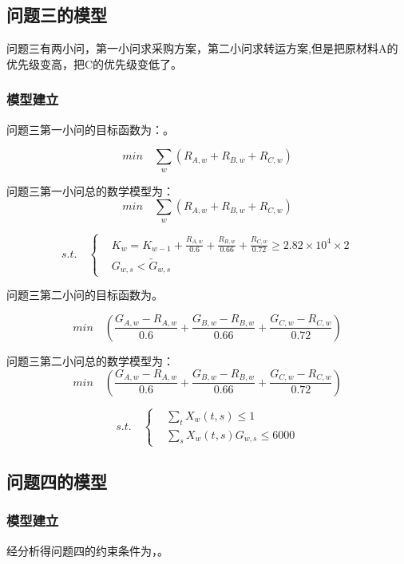 \documentclass[withoutpreface,bwprint]{cumcmthesis} %
\begin{document}
\subsection{问题三的模型}
问题三有两小问，第一小问求采购方案，第二小问求转运方案,但是把原材料A的优先级变高，把C的优先级变低了。
\subsubsection{模型建立}

问题三第一小问的目标函数为：。

\begin{equation}
min \quad \sum\limits_w(R_{A,w}+R_{B,w}+R_{C,w})
\label{eq:yue4}
\end{equation}

问题三第一小问总的数学模型为：
\[
min \quad \sum\limits_w(R_{A,w}+R_{B,w}+R_{C,w})
\]

$$ s.t. \quad \left\{
\begin{aligned}
    & K_w=K_{w-1}+\frac{R_{A,w}}{0.6}+\frac{R_{B,w}}{0.66}+\frac{R_{C,w}}{0.72}\ge 2.82\times 10^4\times 2 \\
    & G_{w,s}<\widetilde{G}_{w,s}
\end{aligned}
\right.
$$

问题三第二小问的目标函数为\cite{eq:yue5}。

\begin{equation}
min \quad (\frac{G_{A,w}-R_{A,w}}{0.6}+\frac{G_{B,w}-R_{B,w}}{0.66}+\frac{G_{C,w}-R_{C,w}}{0.72})
\label{eq:yue5}
\end{equation}

问题三第二小问总的数学模型为：
\[
min \quad (\frac{G_{A,w}-R_{A,w}}{0.6}+\frac{G_{B,w}-R_{B,w}}{0.66}+\frac{G_{C,w}-R_{C,w}}{0.72})
\]

$$ s.t. \quad \left\{
\begin{aligned}
    & \sum\limits_t X_w(t,s)\le 1 \\
    & \sum\limits_s X_w(t,s)G_{w,s}\le 6000
\end{aligned}
\right.
$$


\subsection{问题四的模型}
\subsubsection{模型建立}
经分析得问题四的约束条件为\cite{eq:re_j1}，\cite{eq:re_j2}。
\end{document}

